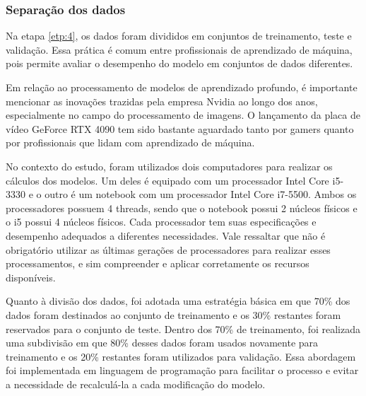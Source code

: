 \subsubsection{Separa\c c\~ao dos dados}\label{subsubsec:divisao}

Na etapa \ref{etp:4}, os dados foram divididos em conjuntos de treinamento, teste e validação. Essa prática é comum entre profissionais de aprendizado de máquina, pois permite avaliar o desempenho do modelo em conjuntos de dados diferentes.

Em relação ao processamento de modelos de aprendizado profundo, é importante mencionar as inovações trazidas pela empresa Nvidia ao longo dos anos, especialmente no campo do processamento de imagens. O lançamento da placa de vídeo GeForce RTX 4090 tem sido bastante aguardado tanto por gamers quanto por profissionais que lidam com aprendizado de máquina.

No contexto do estudo, foram utilizados dois computadores para realizar os cálculos dos modelos. Um deles é equipado com um processador Intel Core i5-3330 e o outro é um notebook com um processador Intel Core i7-5500. Ambos os processadores possuem 4 threads, sendo que o notebook possui 2 núcleos físicos e o i5 possui 4 núcleos físicos. Cada processador tem suas especificações e desempenho adequados a diferentes necessidades. Vale ressaltar que não é obrigatório utilizar as últimas gerações de processadores para realizar esses processamentos, e sim compreender e aplicar corretamente os recursos disponíveis.

Quanto à divisão dos dados, foi adotada uma estratégia básica em que 70\% dos dados foram destinados ao conjunto de treinamento e os 30\% restantes foram reservados para o conjunto de teste. Dentro dos 70\% de treinamento, foi realizada uma subdivisão em que 80\% desses dados foram usados novamente para treinamento e os 20\% restantes foram utilizados para validação. Essa abordagem foi implementada em linguagem de programação para facilitar o processo e evitar a necessidade de recalculá-la a cada modificação do modelo.